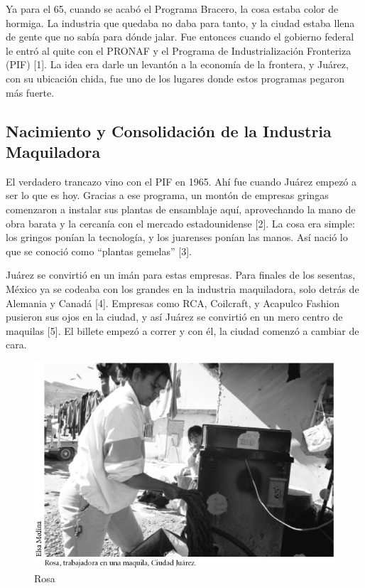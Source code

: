 \documentclass[
  letterpaper,
]{book}
\begin{document}
Ya para el 65, cuando se acabó el Programa Bracero, la cosa estaba color
de hormiga. La industria que quedaba no daba para tanto, y la ciudad
estaba llena de gente que no sabía para dónde jalar. Fue entonces cuando
el gobierno federal le entró al quite con el PRONAF y el Programa de
Industrialización Fronteriza (PIF) {[}1{]}. La idea era darle un
levantón a la economía de la frontera, y Juárez, con su ubicación chida,
fue uno de los lugares donde estos programas pegaron más fuerte.

\subsection{Nacimiento y Consolidación de la Industria
Maquiladora}\label{nacimiento-y-consolidaciuxf3n-de-la-industria-maquiladora}

El verdadero trancazo vino con el PIF en 1965. Ahí fue cuando Juárez
empezó a ser lo que es hoy. Gracias a ese programa, un montón de
empresas gringas comenzaron a instalar sus plantas de ensamblaje aquí,
aprovechando la mano de obra barata y la cercanía con el mercado
estadounidense {[}2{]}. La cosa era simple: los gringos ponían la
tecnología, y los juarenses ponían las manos. Así nació lo que se
conoció como ``plantas gemelas'' {[}3{]}.

Juárez se convirtió en un imán para estas empresas. Para finales de los
sesentas, México ya se codeaba con los grandes en la industria
maquiladora, solo detrás de Alemania y Canadá {[}4{]}. Empresas como
RCA, Coilcraft, y Acapulco Fashion pusieron sus ojos en la ciudad, y así
Juárez se convirtió en un mero centro de maquilas {[}5{]}. El billete
empezó a correr y con él, la ciudad comenzó a cambiar de cara.

\begin{figure}[H]

{\centering \includegraphics{Img/Rosa.jpg}

}

\caption{Rosa}

\end{figure}%
\end{document}
